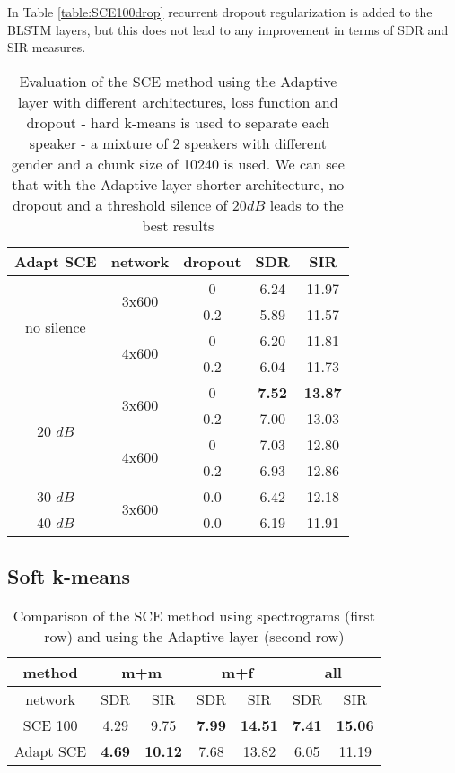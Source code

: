 \documentclass[master,final,11pt]{iscs-thesis}
\begin{document}
In Table \ref{table:SCE100drop} recurrent dropout regularization is added to the BLSTM layers, but this does not lead to any improvement in terms of SDR and SIR measures.

\begin{table}[h]
\centering
\begin{tabular}{c|c|c|c|c}
Adapt SCE & network & dropout & SDR & SIR \\ 
\hline
\multirow{4}{*}{no silence}  & \multirow{2}{*}{3x600} & 0 & 6.24 & 11.97 \\ 
\cline{3-5}
 &  & 0.2 & 5.89 & 11.57 \\
\cline{2-5}
 & \multirow{2}{*}{4x600} & 0 & 6.20 & 11.81 \\
\cline{3-5}
 &  & 0.2 & 6.04 & 11.73 \\
\hline
\multirow{4}{*}{20 $dB$}  & \multirow{2}{*}{3x600} & 0 & \textbf{7.52} & \textbf{13.87} \\ 
\cline{3-5}
 &  & 0.2 & 7.00 & 13.03 \\
\cline{2-5}
 & \multirow{2}{*}{4x600} & 0 & 7.03 & 12.80 \\
\cline{3-5}
 &  & 0.2 & 6.93 & 12.86 \\
\hline
30 $dB$ & \multirow{2}{*}{3x600} & 0.0 & 6.42 & 12.18 \\
\cline{1-1}\cline{3-5}
40 $dB$ &  & 0.0 & 6.19 & 11.91 \\
\end{tabular}
\captionsetup{justification=centering}
\caption{Evaluation of the SCE method using the Adaptive layer with different architectures, loss function and dropout - hard k-means is used to separate each speaker - a mixture of 2 speakers with different gender and a chunk size of 10240 is used. We can see that with the Adaptive layer shorter architecture, no dropout and a threshold silence of $20dB$ leads to the best results}
\label{table:AdaptSCE100drop}
\end{table}



\subsection{Soft k-means}
\label{softkmeans}

\begin{table}[h]
\centering
\begin{tabular}{c|c|c|c|c|c|c}
method & \multicolumn{2}{c|}{m+m} & \multicolumn{2}{c|}{m+f} & \multicolumn{2}{c}{all} \\ 
\hline 
network & SDR & SIR & SDR & SIR & SDR & SIR \\ 
\hline 
SCE 100 & 4.29 & 9.75 & \textbf{7.99} & \textbf{14.51} & \textbf{7.41} & \textbf{15.06} \\ 
Adapt SCE & \textbf{4.69} & \textbf{10.12} & 7.68 & 13.82 & 6.05 & 11.19 \\ 
\end{tabular}
\captionsetup{justification=centering}
\caption{Comparison of the SCE method using spectrograms (first row) and using the Adaptive layer (second row)}
\label{table:SCE100softrecap}
\end{table}
\end{document}
